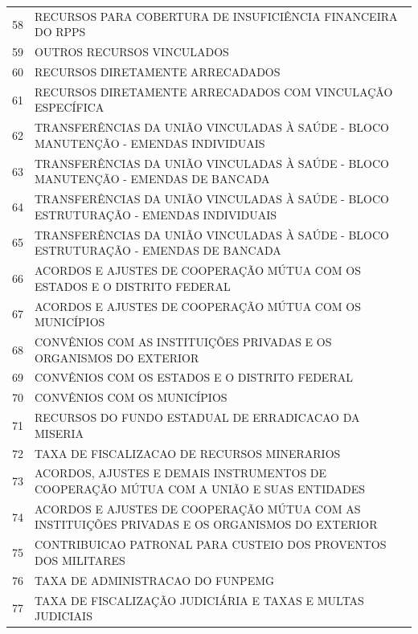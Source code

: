 \documentclass{article}
\begin{document}
\begin{longtable}[c]{m{1cm}|m{11cm}}
\multicolumn{1}{c|}{ 58 } & RECURSOS PARA COBERTURA DE INSUFICIÊNCIA FINANCEIRA DO RPPS \\
\multicolumn{1}{c|}{ 59 } & OUTROS RECURSOS VINCULADOS \\
\multicolumn{1}{c|}{ 60 } & RECURSOS DIRETAMENTE ARRECADADOS \\
\multicolumn{1}{c|}{ 61 } & RECURSOS DIRETAMENTE ARRECADADOS COM VINCULAÇÃO ESPECÍFICA \\
\multicolumn{1}{c|}{ 62 } & TRANSFERÊNCIAS DA UNIÃO VINCULADAS À SAÚDE - BLOCO MANUTENÇÃO - EMENDAS INDIVIDUAIS \\
\multicolumn{1}{c|}{ 63 } & TRANSFERÊNCIAS DA UNIÃO VINCULADAS À SAÚDE - BLOCO MANUTENÇÃO - EMENDAS DE BANCADA \\
\multicolumn{1}{c|}{ 64 } & TRANSFERÊNCIAS DA UNIÃO VINCULADAS À SAÚDE - BLOCO ESTRUTURAÇÃO - EMENDAS INDIVIDUAIS \\
\multicolumn{1}{c|}{ 65 } & TRANSFERÊNCIAS DA UNIÃO VINCULADAS À SAÚDE - BLOCO ESTRUTURAÇÃO - EMENDAS DE BANCADA \\
\multicolumn{1}{c|}{ 66 } & ACORDOS E AJUSTES DE COOPERAÇÃO MÚTUA COM OS ESTADOS E O DISTRITO FEDERAL \\
\multicolumn{1}{c|}{ 67 } & ACORDOS E AJUSTES DE COOPERAÇÃO MÚTUA COM OS MUNICÍPIOS \\
\multicolumn{1}{c|}{ 68 } & CONVÊNIOS COM AS INSTITUIÇÕES PRIVADAS E OS ORGANISMOS DO EXTERIOR \\
\multicolumn{1}{c|}{ 69 } & CONVÊNIOS COM OS ESTADOS E O DISTRITO FEDERAL \\
\multicolumn{1}{c|}{ 70 } & CONVÊNIOS COM OS MUNICÍPIOS \\
\multicolumn{1}{c|}{ 71 } & RECURSOS DO FUNDO ESTADUAL DE ERRADICACAO DA MISERIA \\
\multicolumn{1}{c|}{ 72 } & TAXA DE FISCALIZACAO DE RECURSOS MINERARIOS \\
\multicolumn{1}{c|}{ 73 } & ACORDOS, AJUSTES E DEMAIS INSTRUMENTOS DE COOPERAÇÃO MÚTUA COM A UNIÃO E SUAS ENTIDADES \\
\multicolumn{1}{c|}{ 74 } & ACORDOS E AJUSTES DE COOPERAÇÃO MÚTUA COM AS INSTITUIÇÕES PRIVADAS E OS ORGANISMOS DO EXTERIOR \\
\multicolumn{1}{c|}{ 75 } & CONTRIBUICAO PATRONAL PARA CUSTEIO DOS PROVENTOS DOS MILITARES \\
\multicolumn{1}{c|}{ 76 } & TAXA DE ADMINISTRACAO DO FUNPEMG \\
\multicolumn{1}{c|}{ 77 } & TAXA DE FISCALIZAÇÃO JUDICIÁRIA E TAXAS E MULTAS JUDICIAIS \\

\end{longtable}
\end{document}
